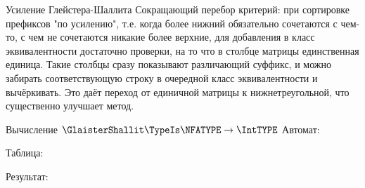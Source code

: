 \begin{frame}{Усиление Глейстера-Шаллита}
    Сокращающий перебор критерий: при сортировке префиксов "по усилению", т.е. когда более нижний обязательно сочетаются с чем-то, с чем не сочетаются никакие более верхние, для добавления в класс эквивалентности достаточно проверки, на то что в столбце матрицы единственная единица. Такие столбцы сразу показывают различающий суффикс, и можно забирать соответствующую строку в очередной класс эквивалентности и вычёркивать. Это даёт переход от единичной матрицы к нижнетреугольной, что существенно улучшает метод.
\end{frame}
\begin{frame}{Вычисление $\GlaisterShallit\TypeIs\NFATYPE\to\IntTYPE$}
	Автомат:


	Таблица:


	Результат:


\end{frame}
